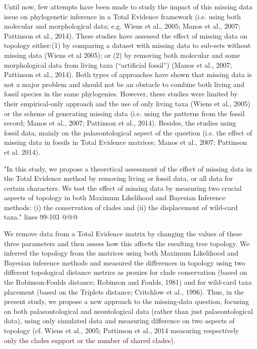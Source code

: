 \documentclass[12pt,letterpaper]{article}
\begin{document}
\begin{enumerate}
Until now, few attempts have been made to study the impact of this missing data issue on phylogenetic inference in a Total Evidence framework (i.e. using both molecular and morphological data; e.g. Wiens et al., 2005; Manos et al., 2007; Pattinson et al., 2014).
These studies have assessed the effect of missing data on topology either:(1) by comparing a dataset with missing data to sub-sets without missing data (Wiens et al 2005); or (2) by removing both molecular and some morphological data from living taxa (``artificial fossil'') (Manos et al., 2007; Pattinson et al., 2014).
Both types of approaches have shown that missing data is not a major problem and should not be an obstacle to combine both living and fossil species in the same phylogenies.
However, these studies were limited by their empirical-only approach and the use of only living taxa (Wiens et al., 2005) or the scheme of generating missing data (i.e. using the patterns from the fossil record; Manos et al., 2007; Pattinson et al., 2014).
Besides, the studies using fossil data, mainly on the palaeontological aspect of the question (i.e. the effect of missing data in fossils in Total Evidence matrices; Manos et al., 2007; Pattinson et al. 2014).

"In this study, we propose a theoretical assessment of the effect of missing data in the Total Evidence method by removing living or fossil data, or all data for certain characters.
We test the effect of missing data by measuring two crucial aspects of topology in both Maximum Likelihood and Bayesian Inference methods: (i) the conservation of clades and (ii) the displacement of wild-card taxa." lines 99-103 @@@

We remove data from a Total Evidence matrix by changing the values of these three parameters and then assess how this affects the resulting tree topology.
We inferred the topology from the matrices using both Maximum Likelihood and Bayesian inference methods and measured the differences in topology using two different topological distance metrics as proxies for clade conservation (based on the Robinson-Foulds distance; Robinson and Foulds, 1981) and for wild-card taxa placement (based on the Triplets distance; Critchlow et al., 1996).
Thus, in the present study, we propose a new approach to the missing-data question, focusing on both palaeontological and neontological data (rather than just palaeontological data), using only simulated data and measuring difference on two aspects of topology (cf. Wiens et al., 2005; Pattinson et al., 2014 measuring respectively only the clades support or the number of shared clades).



\end{enumerate}
\end{document}
